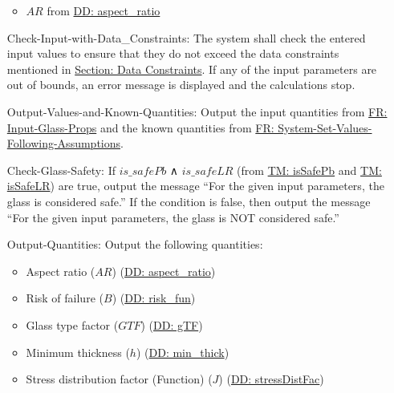\documentclass[12pt]{article}
\begin{document}
\begin{itemize}
\begin{itemize}
                                                                                                \item{$AR$ from \hyperref[DD:aspect.ratio]{DD: aspect\_ratio}}
                                                                                                \end{itemize}
\item[Check-Input-with-Data\_Constraints:\phantomsection\label{checkInputWithDataCons}]The system shall check the entered input values to ensure that they do not exceed the data constraints mentioned in \hyperref[Sec:DataConstraints]{Section: Data Constraints}. If any of the input parameters are out of bounds, an error message is displayed and the calculations stop.
\item[Output-Values-and-Known-Quantities:\phantomsection\label{outputValsAndKnownQuants}]Output the input quantities from \hyperref[inputGlassProps]{FR: Input-Glass-Props} and the known quantities from \hyperref[sysSetValsFollowingAssumps]{FR: System-Set-Values-Following-Assumptions}.
\item[Check-Glass-Safety:\phantomsection\label{checkGlassSafety}]If $is\_safePb$ ∧ $is\_safeLR$ (from \hyperref[T:isSafePb]{TM: isSafePb} and \hyperref[T:isSafeLR]{TM: isSafeLR}) are true, output the message ``For the given input parameters, the glass is considered safe.'' If the condition is false, then output the message ``For the given input parameters, the glass is NOT considered safe.''
\item[Output-Quantities:\phantomsection\label{outputQuants}]Output the following quantities:
                                                            \begin{itemize}
                                                            \item{Aspect ratio ($AR$) (\hyperref[DD:aspect.ratio]{DD: aspect\_ratio})}
                                                            \item{Risk of failure ($B$) (\hyperref[DD:risk.fun]{DD: risk\_fun})}
                                                            \item{Glass type factor ($GTF$) (\hyperref[DD:gTF]{DD: gTF})}
                                                            \item{Minimum thickness ($h$) (\hyperref[DD:min.thick]{DD: min\_thick})}
                                                            \item{Stress distribution factor (Function) ($J$) (\hyperref[DD:stressDistFac]{DD: stressDistFac})}

\end{itemize}
\end{itemize}
\end{document}
